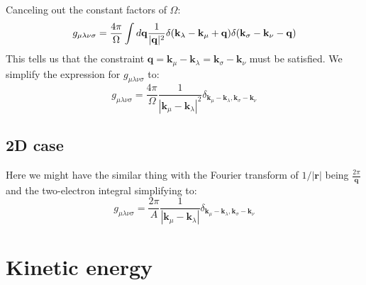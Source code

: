 \documentclass[12pt]{article}
\begin{document}
Canceling out the constant factors of $\Omega $:
\begin{equation}
    g_{\mu\lambda\nu\sigma} = \frac{4\pi}{\Omega } \int d\mathbf{q} \frac{1}{|\vb{q}|^2} \delta(\mathbf{k}_\lambda - \mathbf{k}_\mu + \mathbf{q}) \delta(\mathbf{k}_\sigma - \mathbf{k}_\nu - \mathbf{q})
\end{equation}
This tells us that the constraint $\mathbf{q} = \mathbf{k}_\mu - \mathbf{k}_\lambda = \mathbf{k}_\sigma - \mathbf{k}_\nu$ must be satisfied. We simplify the expression for $g_{\mu\lambda\nu\sigma}$ to:
\begin{equation}
    g_{\mu\lambda\nu\sigma} = \frac{4\pi}{\Omega } \frac{1}{|\mathbf{k}_\mu - \mathbf{k}_\lambda|^2} \delta_{\mathbf{k}_\mu - \mathbf{k}_\lambda, \mathbf{k}_\sigma - \mathbf{k}_\nu}
\end{equation}

\subsection{2D case}
Here we might have the similar thing with the Fourier transform of $1/|\mathbf{r}|$ being $\frac{2\pi}{\mathbf{q}}$ and the two-electron integral simplifying to:
\begin{equation}
    g_{\mu\lambda\nu\sigma} = \frac{2\pi}{A} \frac{1}{|\mathbf{k}_\mu - \mathbf{k}_\lambda|} \delta_{\mathbf{k}_\mu - \mathbf{k}_\lambda, \mathbf{k}_\sigma - \mathbf{k}_\nu}
\end{equation}


\section{Kinetic energy}
\end{document}
